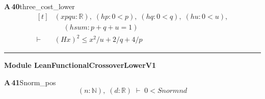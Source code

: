 \documentclass[conference]{IEEEtran}
\theoremstyle{definition}
\newcommand{\lean}[1]{\textsf{\footnotesize #1}}
\begin{document}
\noindent\textbf{A\,40}\quad\lean{three\_cost\_lower}
{\footnotesize\[ \begin{aligned}[t]
&(\mathit{x} \mathit{p} \mathit{q} \mathit{u} : \mathbb{R} ),\; (\mathit{hp} : 0<\mathit{p}),\; (\mathit{hq} : 0<\mathit{q}),\; (\mathit{hu} : 0<\mathit{u}),\\
&\quad \; (\mathit{hsum} : \mathit{p}+\mathit{q}+\mathit{u}=1)\\
\vdash\;&(\mathit{H} \mathit{x})^{2} \leq \mathit{x}^{2}/\mathit{u}+2/\mathit{q}+4/\mathit{p}
\end{aligned} \]}

\vspace{4pt}\noindent\rule{\columnwidth}{0.4pt}\par\vspace{2pt}
\noindent\textbf{Module \lean{LeanFunctionalCrossoverLowerV1}}\par\vspace{3pt}

\noindent\textbf{A\,41}\quad\lean{Snorm\_pos}
{\footnotesize\[ (\mathit{n} : \mathbb{N} ),\; (\mathit{d} : \mathbb{R} ) \;\vdash\; 0 < \mathit{Snorm} \mathit{n} \mathit{d} \]}
\end{document}
